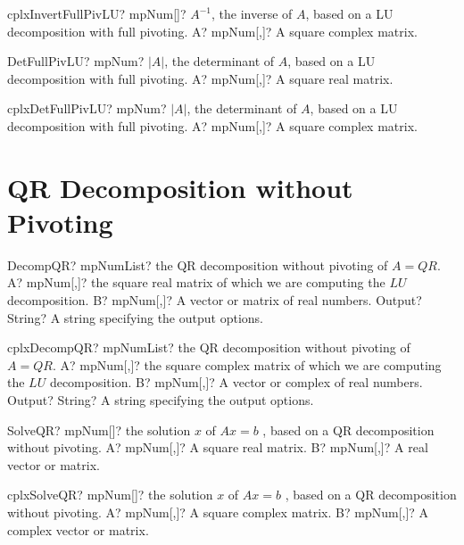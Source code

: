 \documentclass[12pt,a4paper,openany]{book}
\begin{document}
\begin{mpFunctionsExtract}
\mpFunctionOne
{cplxInvertFullPivLU? mpNum[]? $A^{-1}$, the inverse of $A$, based on a LU decomposition with full pivoting.}
{A? mpNum[,]? A square complex matrix.}
\end{mpFunctionsExtract}

\begin{mpFunctionsExtract}
\mpFunctionOne
{DetFullPivLU? mpNum? $|A|$, the determinant of $A$, based on a LU decomposition with full pivoting.}
{A? mpNum[,]? A square real matrix.}
\end{mpFunctionsExtract}

\begin{mpFunctionsExtract}
\mpFunctionOne
{cplxDetFullPivLU? mpNum? $|A|$, the determinant of $A$, based on a LU decomposition with full pivoting.}
{A? mpNum[,]? A square complex matrix.}
\end{mpFunctionsExtract}

\section{QR Decomposition without Pivoting}

\begin{mpFunctionsExtract}
\mpFunctionThree
{DecompQR? mpNumList? the QR decomposition without pivoting of $A = QR$.}
{A? mpNum[,]? the square real matrix of which we are computing the $LU$ decomposition.}
{B? mpNum[,]? A vector or matrix of real numbers.}
{Output? String? A string specifying the output options.}
\end{mpFunctionsExtract}

\begin{mpFunctionsExtract}
\mpFunctionThree
{cplxDecompQR? mpNumList? the QR decomposition without pivoting of $A = QR$.}
{A? mpNum[,]? the square complex matrix of which we are computing the $LU$ decomposition.}
{B? mpNum[,]? A vector or complex of real numbers.}
{Output? String? A string specifying the output options.}
\end{mpFunctionsExtract}

\begin{mpFunctionsExtract}
\mpFunctionTwo
{SolveQR? mpNum[]? the solution $x$ of $A x = b$ , based on a QR decomposition without pivoting.}
{A? mpNum[,]? A square real matrix.}
{B? mpNum[,]? A real vector or matrix.}
\end{mpFunctionsExtract}

\begin{mpFunctionsExtract}
\mpFunctionTwo
{cplxSolveQR? mpNum[]? the solution $x$ of $A x = b$ , based on a QR decomposition without pivoting.}
{A? mpNum[,]? A square complex matrix.}
{B? mpNum[,]? A complex vector or matrix.}
\end{mpFunctionsExtract}
\end{document}
